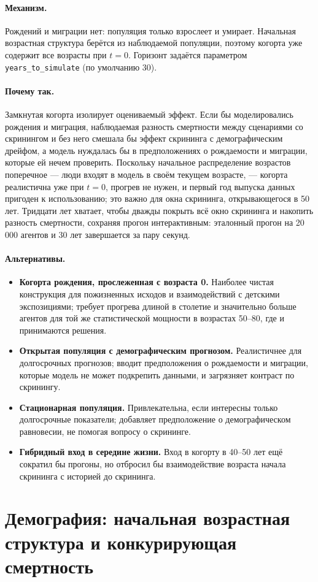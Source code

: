 \documentclass[12pt,a4paper]{article}
\newcommand{\id}[1]{\texttt{#1}}
\newcommand{\mech}[1]{\paragraph{Механизм.} #1}
\newcommand{\why}[1]{\paragraph{Почему так.} #1}
\newcommand{\alt}[1]{\paragraph{Альтернативы.} #1}
\begin{document}
\mech{Рождений и миграции нет: популяция только взрослеет и умирает. Начальная возрастная структура
берётся из наблюдаемой популяции, поэтому когорта уже содержит все возрасты при $t=0$. Горизонт задаётся
параметром \id{years\_to\_simulate} (по умолчанию 30).}

\why{Замкнутая когорта изолирует оцениваемый эффект. Если бы моделировались рождения и миграция,
наблюдаемая разность смертности между сценариями со скринингом и без него смешала бы эффект скрининга с
демографическим дрейфом, а модель нуждалась бы в предположениях о рождаемости и миграции, которые ей нечем
проверить. Поскольку начальное распределение возрастов поперечное --- люди входят в модель в своём текущем
возрасте, --- когорта реалистична уже при $t=0$, прогрев не нужен, и первый год выпуска данных пригоден к
использованию; это важно для окна скрининга, открывающегося в 50 лет. Тридцати лет хватает, чтобы дважды
покрыть всё окно скрининга и накопить разность смертности, сохраняя прогон интерактивным: эталонный прогон
на 20\,000 агентов и 30 лет завершается за пару секунд.}

\alt{\begin{itemize}[nosep]
  \item \textbf{Когорта рождения, прослеженная с возраста 0.} Наиболее чистая конструкция для пожизненных
        исходов и взаимодействий с детскими экспозициями; требует прогрева длиной в столетие и значительно
        больше агентов для той же статистической мощности в возрастах 50--80, где и принимаются решения.
  \item \textbf{Открытая популяция с демографическим прогнозом.} Реалистичнее для долгосрочных прогнозов;
        вводит предположения о рождаемости и миграции, которые модель не может подкрепить данными, и
        загрязняет контраст по скринингу.
  \item \textbf{Стационарная популяция.} Привлекательна, если интересны только долгосрочные показатели;
        добавляет предположение о демографическом равновесии, не помогая вопросу о скрининге.
  \item \textbf{Гибридный вход в середине жизни.} Вход в когорту в 40--50 лет ещё сократил бы прогоны, но
        отбросил бы взаимодействие возраста начала скрининга с историей до скрининга.
\end{itemize}}

\section{Демография: начальная возрастная структура и конкурирующая смертность}
\end{document}
